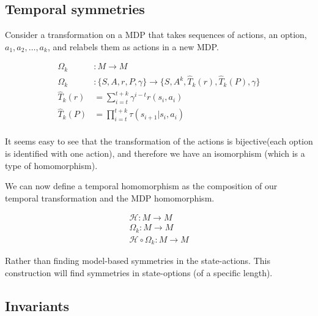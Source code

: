 \subsection{Temporal symmetries}\label{temporal-homomorphism}

Consider a transformation on a MDP that takes sequences of actions, an option, $a_1, a_2, \dots, a_k$, and relabels them as actions in a new MDP.

\begin{align*}
\Omega_k&: M \to M \\
\Omega_k&:\{S, A, r, P, \gamma\} \to \{S, A^k, \hat T_k(r), \hat T_k(P), \gamma\} \\
\hat T_k(r) &= \sum_{i=t}^{t+k} \gamma^{i-t} r(s_i, a_i) \\
\hat T_k(P) &= \prod_{i=t}^{t+k} \tau(s_{i+1} | s_i, a_i) \\
\end{align*}

It seems easy to see that the transformation of the actions is bijective\footnotemark (each option is identified with one action), and therefore we have an isomorphism (which is a type of homomorphism).




We can now define a temporal homomorphism as the composition of our temporal transformation and the MDP homomorphism.

\begin{align*}
\mathcal H: M \to M \tag{MDP homomorphism}\\
\Omega_k: M \to M \tag{temporal transformation}\\
\mathcal H\circ \Omega_k : M \to M \tag{temporal homomorphism}
\end{align*}

Rather than finding model-based symmetries in the state-actions. This construction will find symmetries
in state-options (of a specific length).

\subsection{Invariants}\label{game-invariants}


